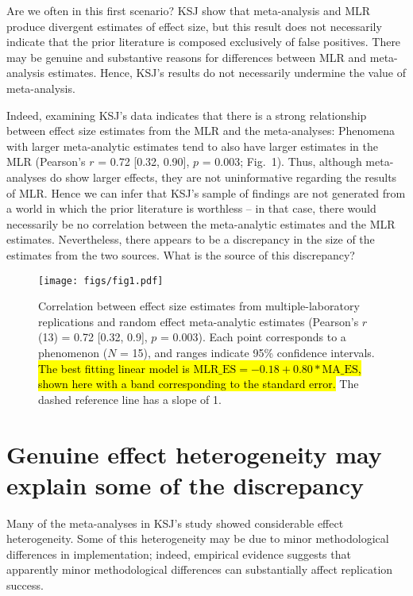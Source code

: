 \documentclass[man,floatsintext]{apa7}
\begin{document}
Are we often in this first scenario? KSJ show that meta-analysis and MLR produce divergent estimates of effect size, but this result does not necessarily indicate that the prior literature is composed exclusively of false positives. There may be genuine and substantive reasons for differences between MLR and meta-analysis estimates. Hence, KSJ's results do not necessarily undermine the value of meta-analysis.

Indeed, examining KSJ’s data indicates that there is a strong relationship between effect size estimates from the MLR and the meta-analyses: Phenomena with larger meta-analytic estimates tend to also have larger estimates in the MLR (Pearson’s $r$ = 0.72 [0.32, 0.90], $p$ = 0.003; Fig.\ 1). Thus, although meta-analyses do show larger effects, they are not uninformative regarding the results of MLR. Hence we can infer that KSJ’s sample of findings are not generated from a world in which the prior literature is worthless -- in that case, there would necessarily be no correlation between the meta-analytic estimates and the MLR estimates. Nevertheless, there appears to be a discrepancy in the size of the estimates from the two sources.  What is the source of this discrepancy? 

\begin{figure}[ht]
\centering
     \texttt{[image: figs/fig1.pdf]}
      \caption{Correlation between effect size estimates from multiple-laboratory replications and random effect meta-analytic estimates (Pearson’s $r$(13) = 0.72 [0.32, 0.9], $p$ = 0.003). Each point corresponds to a phenomenon ($N$ = 15), and ranges indicate 95\% confidence intervals. \hl{The best fitting linear model is $\text{MLR\_ES}= -0.18  +  0.80 *\text{MA\_ ES}$, shown here with a band corresponding to the standard error.} The dashed reference line has a slope of 1. }
\end{figure}


\section{Genuine effect heterogeneity may explain some of the discrepancy}


Many of the meta-analyses in KSJ’s study showed considerable effect heterogeneity. Some of this heterogeneity may be due to minor methodological differences in implementation; indeed, empirical evidence suggests that apparently minor methodological differences can substantially affect replication success. 
\end{document}
